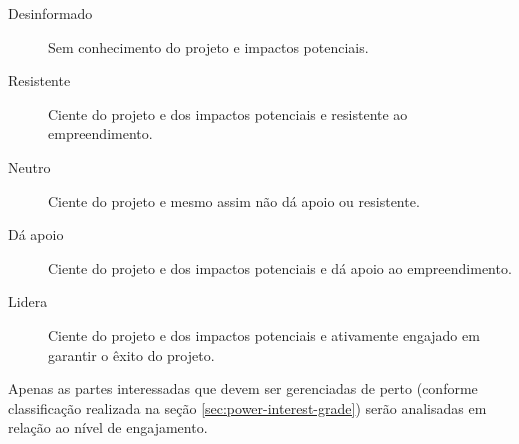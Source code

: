 \begin{description}
	\item[Desinformado] Sem conhecimento do projeto e impactos potenciais.
	\item[Resistente] Ciente do projeto e dos impactos potenciais e resistente ao empreendimento.
	\item[Neutro] Ciente do projeto e mesmo assim não dá apoio ou resistente.
	\item[Dá apoio] Ciente do projeto e dos impactos potenciais e dá apoio ao empreendimento.
	\item[Lidera] Ciente do projeto e dos impactos potenciais e ativamente engajado em garantir o êxito do projeto.
\end{description}

Apenas as partes interessadas que devem ser gerenciadas de perto (conforme classificação realizada na seção \ref{sec:power-interest-grade}) serão analisadas em relação ao nível de engajamento.

